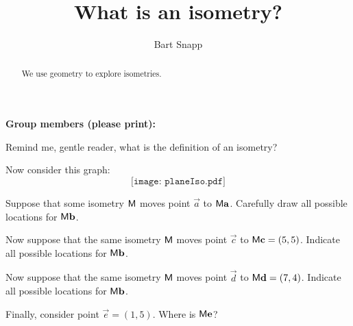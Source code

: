 \documentclass[noauthor,nooutcomes]{ximera}
\title{What is an isometry?}
\author{Bart Snapp}
\begin{document}
\begin{abstract}
We use geometry to explore isometries.
\end{abstract}
\maketitle

\noindent\textbf{Group members (please print):}\ \hrulefill \\

\hrulefill

\begin{problem}
Remind me, gentle reader, what is the definition of an isometry?

\vspace{2.5in}

\end{problem}

Now consider this graph:
\[
\texttt{[image: planeIso.pdf]}
\]

\begin{problem}
Suppose that some isometry $\mathsf{M}$ moves point $\vec{a}$ to
$\mathsf{M}\mathbf{a}$. Carefully draw all possible locations for
$\mathsf{M}\mathbf{b}$.
\end{problem}

\begin{problem}
Now suppose that the same isometry $\mathsf{M}$ moves point $\vec{c}$ to
$\mathsf{M}\mathbf{c} = (5,5)$. Indicate all possible locations for
$\mathsf{M}\mathbf{b}$.
\end{problem}

\begin{problem}
Now suppose that the same isometry $\mathsf{M}$ moves point $\vec{d}$ to
$\mathsf{M}\mathbf{d} = (7,4)$. Indicate all possible locations for
$\mathsf{M}\mathbf{b}$.
\end{problem}



\begin{problem}
Finally, consider point $\vec{e} = (1,5)$. Where is $\mathsf{M}\mathbf{e}$?
\end{problem}
\end{document}
